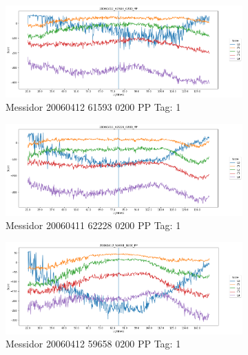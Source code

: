 \begin{figure}[ht!]
	\centering
	\begin{subfigure}[b]{ 0.85\textwidth}
		\centering
		\includegraphics[width=\textwidth]{Figures/chapter_stability/20060412_61593_0200_PP/l/scores.png}
		\caption{Messidor 20060412 61593 0200 PP Tag: 1}
	\end{subfigure}
	\begin{subfigure}[b]{ 0.85\textwidth}
		\centering
		\includegraphics[width=\textwidth]{Figures/chapter_stability/20060411_62228_0200_PP/l/scores.png}
		\caption{Messidor 20060411 62228 0200 PP Tag: 1}		
	\end{subfigure}	
	\begin{subfigure}[b]{ 0.85\textwidth}
		\centering
		\includegraphics[width=\textwidth]{Figures/chapter_stability/20060412_59658_0200_PP/l/scores.png}
		\caption{Messidor 20060412 59658 0200 PP Tag: 1}		
	\end{subfigure}
	\begin{subfigure}[b]{ 0.85\textwidth}

\end{subfigure}
\end{figure}
